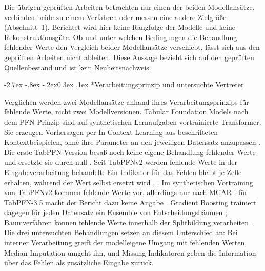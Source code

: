 \documentclass[12pt,a4paper]{article}
\makeatletter
\renewcommand\subsection{\@startsection{subsection}{2}{\z@}%
  {-2.7ex \@plus -.8ex \@minus -.2ex}{0.3ex \@plus .1ex}%
  {\normalfont\large\bfseries}}
\makeatother
\begin{document}
Die übrigen geprüften Arbeiten betrachten nur einen der beiden
Modellansätze, verbinden beide zu einem Verfahren oder messen eine
andere Zielgröße (Abschnitt~1). Berichtet wird hier keine Rangfolge der
Modelle und keine Rekonstruktionsgüte. Ob und unter welchen
Bedingungen die Behandlung fehlender Werte den Vergleich beider
Modellansätze verschiebt, lässt sich aus den geprüften Arbeiten nicht
ableiten. Diese Aussage bezieht sich auf den geprüften Quellenbestand
und ist kein Neuheitsnachweis.

\subsection*{Verarbeitungsprinzip und untersuchte Vertreter}

Verglichen werden zwei Modellansätze anhand ihres
Verarbeitungsprinzips für fehlende Werte, nicht zwei Modellversionen.
Tabular Foundation Models nach dem PFN-Prinzip sind auf synthetischen
Lernaufgaben vortrainierte Transformer. Sie erzeugen Vorhersagen per
In-Context Learning aus beschrifteten Kontextbeispielen, ohne ihre
Parameter an den jeweiligen Datensatz anzupassen
\cite{muller_transformers_2024,hollmann_tabpfn_2023}. Die erste
TabPFN-Version besaß noch keine eigene Behandlung fehlender Werte und
ersetzte sie durch null \cite[Anhang C.2.4]{hollmann_tabpfn_2023}.
Seit TabPFNv2 werden fehlende Werte in der Eingabeverarbeitung
behandelt: Ein Indikator für das Fehlen bleibt je Zelle erhalten,
während der Wert selbst ersetzt wird
\cite[Methods]{hollmann_accurate_2025},
\cite[Abschnitt 3.1]{jager_tabpfn-35_2026}. Im synthetischen
Vortraining von TabPFNv2 kommen fehlende Werte vor, allerdings nur
nach MCAR \cite[Methods]{hollmann_accurate_2025}; für TabPFN-3.5
macht der Bericht dazu keine Angabe
\cite[Abschnitt 3.3]{jager_tabpfn-35_2026}.
Gradient Boosting trainiert dagegen für jeden Datensatz ein Ensemble
von Entscheidungsbäumen \cite{ke2017lightgbm}; Baumverfahren können
fehlende Werte innerhalb der Splitbildung verarbeiten
\cite{perez_benchmarking_2022}.
Die drei untersuchten Behandlungen setzen an diesem Unterschied an:
Bei interner Verarbeitung greift der modelleigene Umgang mit
fehlenden Werten, Median-Imputation umgeht ihn, und
Missing-Indikatoren geben die Information über das Fehlen als
zusätzliche Eingabe zurück.
\end{document}
